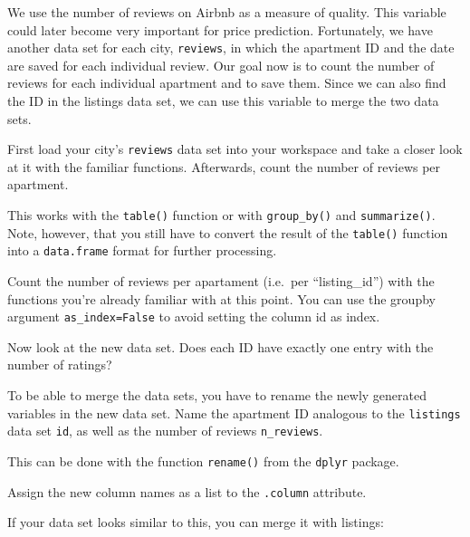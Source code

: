 \documentclass[
  11pt,
]{article}
\newenvironment{tips}[1]
  {
  \begin{itemize}
  \footnotesize
  \renewcommand{\labelitemi}{
    \raisebox{-.7\height}[0pt][0pt]{
      {\setkeys{Gin}{width=3em,keepaspectratio}
        \texttt{[image: images/\#1.png]}}
    }
  }
  \setlength{\fboxsep}{1em}
  \begin{rbox}
  \item
  }
  {
  \end{rbox}
  \end{itemize}
  }
\newenvironment{tipsp}[1]
  {
  \begin{itemize}
  \footnotesize
  \renewcommand{\labelitemi}{
    \raisebox{-.7\height}[0pt][0pt]{
      {\setkeys{Gin}{width=3em,keepaspectratio}
        \texttt{[image: images/\#1.png]}}
    }
  }
  \setlength{\fboxsep}{1em}
  \begin{pbox}
  \item
  }
  {
  \end{pbox}
  \end{itemize}
  }
\begin{document}
We use the number of reviews on Airbnb as a measure of quality. This variable could later become very important for price prediction. Fortunately, we have another data set for each city, \texttt{reviews}, in which the apartment ID and the date are saved for each individual review. Our goal now is to count the number of reviews for each individual apartment and to save them. Since we can also find the ID in the listings data set, we can use this variable to merge the two data sets.

First load your city's \texttt{reviews} data set into your workspace and take a closer look at it with the familiar functions. Afterwards, count the number of reviews per apartment.

\begin{tips}r
This works with the \texttt{table()} function or with \texttt{group\_by()} and \texttt{summarize()}. Note, however, that you still have to convert the result of the \texttt{table()} function into a \texttt{data.frame} format for further processing.

\end{tips}

\begin{tipsp}p
Count the number of reviews per apartament (i.e.~per ``listing\_id'') with the functions you're already familiar with at this point. You can use the groupby argument \texttt{as\_index=False} to avoid setting the column id as index.

\end{tipsp}

Now look at the new data set. Does each ID have exactly one entry with the number of ratings?

To be able to merge the data sets, you have to rename the newly generated variables in the new data set. Name the apartment ID analogous to the \texttt{listings} data set \texttt{id}, as well as the number of reviews \texttt{n\_reviews}.

\begin{tips}r
This can be done with the function \texttt{rename()} from the \texttt{dplyr} package.

\end{tips}

\begin{tipsp}p
Assign the new column names as a list to the \texttt{.column} attribute.

\end{tipsp}

If your data set looks similar to this, you can merge it with listings:
\end{document}
